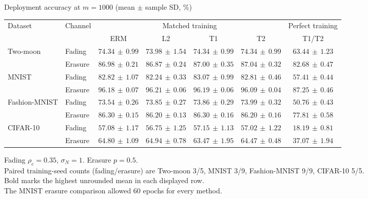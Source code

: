 \documentclass[border=4pt]{standalone}
\begin{document}
\begin{minipage}{7.8in}
\centering
Deployment accuracy at $m=1000$ (mean $\pm$ sample SD, \%)\\[4pt]
\begin{tabular*}{\linewidth}{@{\extracolsep{\fill}}llccccc@{}}
\toprule
\multirow{2}{*}{Dataset} & \multirow{2}{*}{Channel} & \multicolumn{4}{c}{Matched training} & Perfect training \\
\cmidrule(lr){3-6}\cmidrule(l){7-7}
 & & ERM & L2 & T1 & T2 & T1/T2 \\
\midrule
\multirow{2}{*}{Two-moon} & Fading & $\mathbf{74.34}\,\pm\,0.99$ & $73.98\,\pm\,1.54$ & $74.34\,\pm\,0.99$ & $74.34\,\pm\,0.99$ & $63.44\,\pm\,1.23$ \\
 & Erasure & $86.98\,\pm\,0.21$ & $86.87\,\pm\,0.24$ & $87.00\,\pm\,0.35$ & $\mathbf{87.04}\,\pm\,0.32$ & $82.68\,\pm\,0.47$ \\
\midrule[0.25pt]
\multirow{2}{*}{MNIST} & Fading & $82.82\,\pm\,1.07$ & $82.24\,\pm\,0.33$ & $\mathbf{83.07}\,\pm\,0.99$ & $82.81\,\pm\,0.46$ & $57.41\,\pm\,0.44$ \\
 & Erasure & $96.18\,\pm\,0.07$ & $\mathbf{96.21}\,\pm\,0.06$ & $96.19\,\pm\,0.06$ & $96.09\,\pm\,0.04$ & $87.25\,\pm\,0.46$ \\
\midrule[0.25pt]
\multirow{2}{*}{Fashion-MNIST} & Fading & $73.54\,\pm\,0.26$ & $73.85\,\pm\,0.27$ & $73.86\,\pm\,0.29$ & $\mathbf{73.99}\,\pm\,0.32$ & $50.76\,\pm\,0.43$ \\
 & Erasure & $\mathbf{86.30}\,\pm\,0.15$ & $86.20\,\pm\,0.13$ & $86.30\,\pm\,0.16$ & $86.20\,\pm\,0.16$ & $77.81\,\pm\,0.58$ \\
\midrule[0.25pt]
\multirow{2}{*}{CIFAR-10} & Fading & $57.08\,\pm\,1.17$ & $56.75\,\pm\,1.25$ & $\mathbf{57.15}\,\pm\,1.13$ & $57.02\,\pm\,1.22$ & $18.19\,\pm\,0.81$ \\
 & Erasure & $64.80\,\pm\,1.09$ & $\mathbf{64.94}\,\pm\,0.78$ & $63.47\,\pm\,1.95$ & $64.47\,\pm\,0.48$ & $37.07\,\pm\,1.94$ \\
\bottomrule
\end{tabular*}
\par\smallskip\raggedright\footnotesize
Fading $\rho_c=0.35$, $\sigma_N=1$. Erasure $p=0.5$.\\
Paired training-seed counts (fading/erasure) are Two-moon 3/5, MNIST 3/9, Fashion-MNIST 9/9, CIFAR-10 5/5.\\
Bold marks the highest unrounded mean in each displayed row.\\
The MNIST erasure comparison allowed 60 epochs for every method.
\end{minipage}
\end{document}
